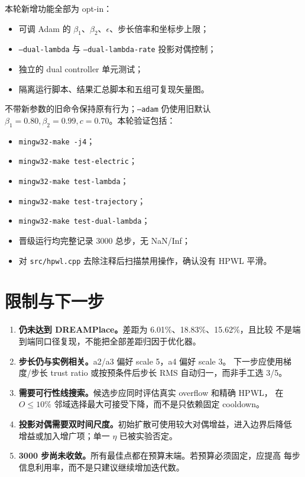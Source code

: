 \documentclass[UTF8,fontset=windows,a4paper,11pt]{ctexart}
\newcommand{\code}[1]{\texttt{#1}}
\begin{document}
本轮新增功能全部为 opt-in：
\begin{itemize}
 \item 可调 Adam 的 $\beta_1$、$\beta_2$、$\epsilon$、步长倍率和坐标步上限；
 \item \code{--dual-lambda} 与 \code{--dual-lambda-rate} 投影对偶控制；
 \item 独立的 dual controller 单元测试；
 \item 隔离运行脚本、结果汇总脚本和五组可复现矢量图。
\end{itemize}
不带新参数的旧命令保持原有行为；\code{--adam} 仍使用旧默认
$\beta_1=0.80,\beta_2=0.99,c=0.70$。本轮验证包括：
\begin{itemize}
 \item \code{mingw32-make -j4}；
 \item \code{mingw32-make test-electric}；
 \item \code{mingw32-make test-lambda}；
 \item \code{mingw32-make test-trajectory}；
 \item \code{mingw32-make test-dual-lambda}；
 \item 晋级运行均完整记录 3000 总步，无 NaN/Inf；
 \item 对 \code{src/hpwl.cpp} 去除注释后扫描禁用操作，确认没有 HPWL 平滑。
\end{itemize}

\section{限制与下一步}

\begin{enumerate}
 \item \textbf{仍未达到 DREAMPlace。}差距为 6.01\%、18.83\%、15.62\%，且比较
  不是端到端同口径复现，不能把全部差距归因于优化器。
 \item \textbf{步长仍与实例相关。}a2/a3 偏好 scale 5，a4 偏好 scale 3。
  下一步应使用梯度/步长 trust ratio 或按预条件后步长 RMS 自动归一，而非手工选 3/5。
 \item \textbf{需要可行性线搜索。}候选步应同时评估真实 overflow 和精确 HPWL，
  在 $O\leq10\%$ 邻域选择最大可接受下降，而不是只依赖固定 cooldown。
 \item \textbf{投影对偶需要双时间尺度。}初始扩散可使用较大对偶增益，进入边界后降低
  增益或加入增广项；单一 $\eta$ 已被实验否定。
 \item \textbf{3000 步尚未收敛。}所有最佳点都在预算末端。若预算必须固定，应提高
  每步信息利用率，而不是只建议继续增加迭代数。
\end{enumerate}
\end{document}
